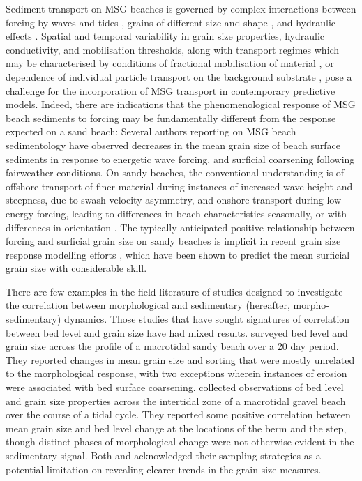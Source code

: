 
Sediment transport on MSG beaches is governed by complex interactions between forcing by waves and tides \citep{Nordstrom_Jackson1993}, grains of different size and shape \citep{Stark_etal2014, Stark_Hay2016}, and hydraulic effects \citep[in/exfiltration and groundwater response;][]{Horn2006}. Spatial and temporal variability in grain size properties, hydraulic conductivity, and mobilisation thresholds, along with transport regimes which may be characterised by conditions of fractional mobilisation of material \citep[e.g.,][]{Wilcock_Crowe2003}, or dependence of individual particle transport on the background substrate \citep{Carter_Orford1993}, pose a challenge for the incorporation of MSG transport in contemporary predictive models. Indeed, there are indications that the phenomenological response of MSG beach sediments to forcing may be fundamentally different from the response expected on a sand beach: Several authors reporting on MSG beach sedimentology \citep{Nordstrom_Jackson1993, Pontee_etal2004, Curtiss_etal2009, Miller_etal2011, Hay_etal2014} have observed decreases in the mean grain size of beach surface sediments in response to energetic wave forcing, and surficial coarsening following fairweather conditions. On sandy beaches, the conventional understanding is of offshore transport of finer material during instances of increased wave height and steepness, due to swash velocity asymmetry, and onshore transport during low energy forcing, leading to differences in beach characteristics seasonally, or with differences in orientation \citep[e.g.,][]{Bascom1951}. The typically anticipated positive relationship between forcing and surficial grain size on sandy beaches is implicit in recent grain size response modelling efforts \citep[see][]{Prodger_etal2016}, which have been shown to predict the mean surficial grain size with considerable skill.

There are few examples in the field literature of studies designed to investigate the correlation between morphological and sedimentary (hereafter, morpho-sedimentary) dynamics. Those studies that have sought signatures of correlation between bed level and grain size have had mixed results. \citet{Masselink_etal2007} surveyed bed level and grain size across the profile of a macrotidal sandy beach over a 20 day period. They reported changes in mean grain size and sorting that were mostly unrelated to the morphological response, with two exceptions wherein instances of erosion were associated with bed surface coarsening. \citet{Austin_Buscombe2008} collected observations of bed level and grain size properties across the intertidal zone of a macrotidal gravel beach over the course of a tidal cycle. They reported some positive correlation between mean grain size and bed level change at the locations of the berm and the step, though distinct phases of morphological change were not otherwise evident in the sedimentary signal. Both \citet{Masselink_etal2007} and \citet{Austin_Buscombe2008} acknowledged their sampling strategies as a potential limitation on revealing clearer trends in the grain size measures.

